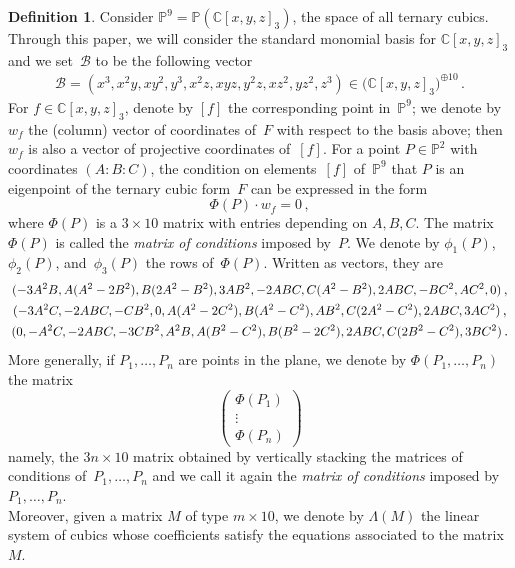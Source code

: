 \documentclass{amsart}
\theoremstyle{plain}
\theoremstyle{definition}
\newtheorem{definition}[lemma]{Definition}
\newcommand{\C}{\mathbb{C}}
\newcommand{\p}{\mathbb{P}}
\newcommand\scalemath[2]{\scalebox{#1}{\mbox{\ensuremath{\displaystyle #2}}}}
\begin{document}
\begin{definition}
\label{definition:matrix_conditions}
 Consider $\p^9 = \p(\C[x,y,z]_3)$, the space of all ternary cubics.
 Through this paper, we will consider the standard monomial basis for $\C[x,y,z]_3$ and we set~$\mathcal{B}$ to be the following vector
 \begin{eqnarray}
  \mathcal{B} = (x^3, x^2 y, x y^2, y^3, x^2 z, x y z, y^2 z, x z^2, y z^2, z^3)
  \in \bigl( \C[x,y,z]_3 \bigr)^{\oplus 10} \,.
  \label{vector_basis}
 \end{eqnarray}
 For $f \in \C[x,y,z]_3$, denote by $[f]$ the corresponding point in~$\p^9$; we denote by $w_f$ the (column) vector of coordinates of~$F$ with respect to the basis above; then $w_f$ is also a vector of projective coordinates of~$[f]$.
 For a point $P \in \p^2$ with coordinates $(A: B: C)$, the condition on elements~$[f]$ of~$\p^9$ that $P$ is an eigenpoint of the ternary cubic form~$F$ can be expressed in the form
 \[
  \Phi(P) \cdot w_f
  = 0 \,,
 \]
 where $\Phi(P)$ is a $3 \times 10$ matrix with entries depending on $A, B, C$.
 The matrix $\Phi(P)$ is called the \emph{matrix of conditions} imposed by~$P$.
We denote by $\phi_1(P)$, $\phi_2(P)$, and~$\phi_3(P)$ the rows of~$\Phi(P)$.
Written as vectors, they are
%
\begin{equation}
\label{equation:matrix_conditions_rows}
\begin{gathered}
\scalemath{0.9}{(-3A^2B, A(A^2 - 2B^2), B(2A^2 - B^2), 3AB^2,
 -2ABC, C(A^2 - B^2), 2 ABC,
 -B C^2, A C^2, 0)} \,, \\
\scalemath{0.9}{(-3A^2 C,
-2ABC,
-CB^2,
0,
A(A^2-2C^2),
B(A^2 - C^2),
AB^2,
C(2A^2-C^2),
2ABC,
3AC^2)} \,,\\
\scalemath{0.9}{(0,
-A^2C,
-2ABC,
-3CB^2,
A^2 B,
A(B^2 - C^2),
B(B^2-2C^2),
2ABC,
C(2B^2-C^2),
3BC^2)} \,.
\end{gathered}
\end{equation}
%
More generally, if $P_1, \dotsc, P_n$ are points in the plane, we denote by $\Phi(P_1, \dotsc, P_n)$ the matrix
%
\[
 \left(
 \begin{array}{c}
  \Phi(P_1) \\
  \vdots \\
  \Phi(P_n)
 \end{array}
 \right)
\]
%
namely, the $3n \times 10$ matrix obtained by vertically stacking the
matrices of conditions of~$P_1, \dotsc, P_n$ and we call it again the
\emph{matrix of
conditions} imposed by $P_1, \dotsc, P_n$. \\
Moreover, given a matrix $M$ of type $m \times 10$, we denote by
$\Lambda(M)$ the linear system of cubics whose coefficients
satisfy the equations associated to the matrix $M$.
\end{definition}
\end{document}
